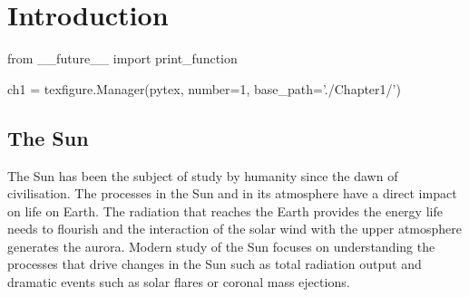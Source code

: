 \label{ch:Intro}
\chapter{Introduction}  %

\begin{pycode}[chapter1]
from __future__ import print_function

ch1 = texfigure.Manager(pytex, number=1, base_path='./Chapter1/')
\end{pycode}

%
%


\section{The Sun} %
The Sun has been the subject of study by humanity since the dawn of civilisation.
The processes in the Sun and in its atmosphere have a direct impact on life on Earth.
The radiation that reaches the Earth provides the energy life needs to flourish and the interaction of the solar wind with the upper atmosphere generates the aurora.
Modern study of the Sun focuses on understanding the processes that drive changes in the Sun such as total radiation output and dramatic events such as solar flares or coronal mass ejections.

